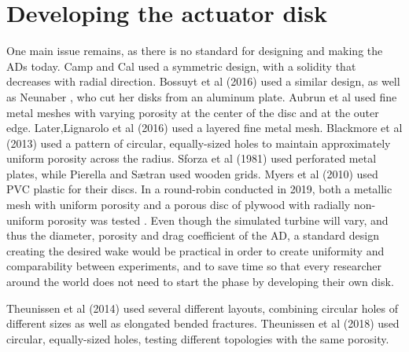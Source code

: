 \section{Developing the actuator disk}

One main issue remains, as there is no standard for designing and making the \gls{AD}s today. Camp and Cal \cite{Camp2016} \cite{Camp2019} used a symmetric design, with a solidity that decreases with radial direction. Bossuyt et al (2016) \cite{Bossuyt2016} used a similar design, as well as Neunaber \cite{Neunaber}, who cut her disks from an aluminum plate. Aubrun et al \cite{Aubrun2013} used fine metal meshes with varying porosity at the center of the disc and at the outer edge. Later,Lignarolo et al (2016) \cite{Lignarolo2016} used a layered fine metal mesh. Blackmore et al (2013) \cite{Blackmore2013} used a pattern of circular, equally-sized holes to maintain approximately uniform porosity across the radius.  Sforza et al (1981) \cite{Sforza1981} used perforated metal plates, while Pierella and Sætran \cite{Pierella2010} used wooden grids. Myers et al (2010) \cite{Myers2010} used PVC plastic for their discs. In a round-robin conducted in 2019, both a metallic mesh with uniform porosity and a porous disc of plywood with radially non-uniform porosity was tested \cite{Aubrun2019}. Even though the simulated turbine will vary, and thus the diameter, porosity and drag coefficient of the \gls{AD}, a standard design creating the desired wake would be practical in order to create uniformity and comparability between experiments, and to save time so that every researcher around the world does not need to start the phase by developing their own disk. 


Theunissen et al (2014) \cite{Thenissen2014} used several different layouts, combining circular holes of different sizes as well as elongated bended fractures. Theunissen et al (2018) \cite{Theunissen2019} used circular, equally-sized holes, testing different topologies with the same porosity. 




